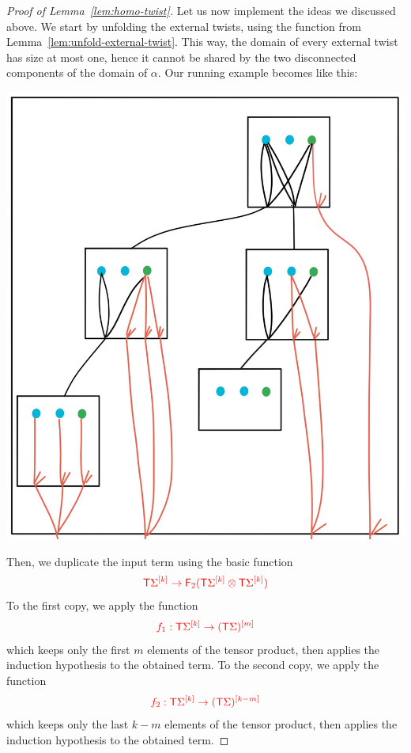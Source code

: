 \begin{proof}[Proof of Lemma~\ref{lem:homo-twist}]
Let us now implement the ideas we discussed above. We start by unfolding the external twists, using the function from Lemma~\ref{lem:unfold-external-twist}. This way, the domain of every external twist has size at most one,  hence it cannot be shared by the two disconnected components of the domain of $\alpha$. Our running example becomes like this:
\begin{center}
\includegraphics[scale=.07]{MyPic29.jpg}
\end{center}
Then, we duplicate the input term using the basic function 
\begin{align*}
\ranked{\tmonad \mati k \Sigma\to \reduce 2 (\tmonad \mati k \Sigma\otimes \tmonad \mati k \Sigma)}
\end{align*}
To the first copy, we apply the function  
\begin{align*}
\ranked{f_1:\tmonad \mati k \Sigma \to \mati m {(\tmonad \Sigma)}}
\end{align*}
which keeps only the first $m$ elements of the tensor product, then applies the induction hypothesis to the obtained term.
To the second copy, we apply the function 
\begin{align*}
\ranked{f_2:\tmonad \mati k \Sigma \to \mati {k-m} {(\tmonad \Sigma)}}
\end{align*}
which keeps only the last $k-m$ elements of the tensor product, then applies the induction hypothesis to the obtained term.


\end{proof}
